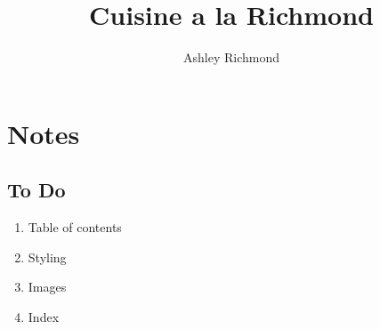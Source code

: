 \documentclass[a4paper]{book}
\title{Cuisine a la Richmond}
\author{Ashley Richmond}
\newcommand*{\ProjectPath}{./src}%
\newcommand*{\RecipesPath}{\ProjectPath/recipes}%
\begin{document}
\maketitle

\chapter{Notes}
  \clearpage

  \section{To Do}
    \begin{enumerate}
      \item Table of contents
      \item Styling
      \item Images
      \item Index
    \end{enumerate}

%




\end{document}
